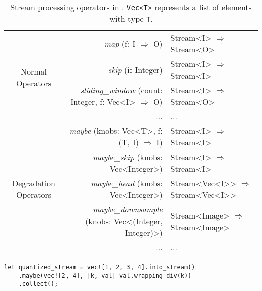\begin{table*}
  \small
  \centering
  \begin{tabular}{ c r l }
    \toprule
    \multirow{4}{*}{Normal Operators}
    & \textit{map} (f: I $\Rightarrow$ O) & Stream<I> $\Rightarrow$ Stream<O> \\
    & \textit{skip} (i: Integer) & Stream<I> $\Rightarrow$
                                   Stream<I> \\
    & \textit{sliding\_window} (count: Integer, f: Vec<I> $\Rightarrow$ O) & Stream<I> $\Rightarrow$
                                                                            Stream<O> \\
    & ... & ... \\
    \midrule
    \multirow{5}{*}{Degradation Operators}
    & \textit{maybe} (knobs: Vec<T>, f:  (T, I) $\Rightarrow$ I) & Stream<I> $\Rightarrow$
                                                                 Stream<I> \\
    & \textit{maybe\_skip} (knobs: Vec<Integer>) & Stream<I> $\Rightarrow$ Stream<I> \\
    & \textit{maybe\_head} (knobs: Vec<Integer>) & Stream<Vec<I>{}> $\Rightarrow$
                                                   Stream<Vec<I>{}> \\
    & \textit{maybe\_downsample} (knobs: Vec<(Integer, Integer)>) & Stream<Image> $\Rightarrow$ Stream<Image> \\
    & ... & ... \\
    \bottomrule
  \end{tabular}
  \vspace{0.2em}
  \caption{Stream processing operators in \sysname{}. \texttt{Vec<T>} represents
    a list of elements with type \texttt{T}.}
  \label{tab:operators}
  \vspace{-1em}
\end{table*}

\vspace{-2pt}
\begin{lstlisting}
let quantized_stream = vec![1, 2, 3, 4].into_stream()
    .maybe(vec![2, 4], |k, val| val.wrapping_div(k))
    .collect();
\end{lstlisting}

